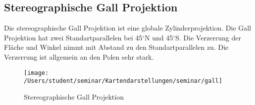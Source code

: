 \subsection{Stereographische Gall Projektion}
\label{sec:stereogall} 
Die stereographische Gall Projektion ist eine globale Zylinderprojektion. Die Gall Projektion hat zwei Standartparallelen bei 45$ ^\circ $N und 45$^\circ $S. Die Verzerrung der Fläche und Winkel nimmt mit Abstand zu den Standartparallelen zu. Die Verzerrung ist allgemein an den Polen sehr stark. \\

\begin{figure}[hbtp]
\centering
\texttt{[image: /Users/student/seminar/Kartendarstellungen/seminar/gall]} \caption{Stereographische Gall Projektion}
\end{figure}
\newpage 